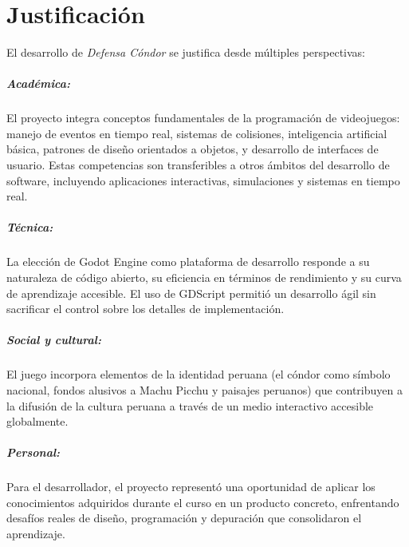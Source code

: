 \documentclass[12pt, a4paper, oneside]{report}
\begin{document}
\newpage

\chapter{Justificación}

El desarrollo de \textit{Defensa Cóndor} se justifica desde múltiples perspectivas:

\paragraph{Académica:}
El proyecto integra conceptos fundamentales de la programación de videojuegos: manejo de eventos en tiempo real, sistemas de colisiones, inteligencia artificial básica, patrones de diseño orientados a objetos, y desarrollo de interfaces de usuario. Estas competencias son transferibles a otros ámbitos del desarrollo de software, incluyendo aplicaciones interactivas, simulaciones y sistemas en tiempo real.

\paragraph{Técnica:}
La elección de Godot Engine como plataforma de desarrollo responde a su naturaleza de código abierto, su eficiencia en términos de rendimiento y su curva de aprendizaje accesible. El uso de GDScript permitió un desarrollo ágil sin sacrificar el control sobre los detalles de implementación.

\paragraph{Social y cultural:}
El juego incorpora elementos de la identidad peruana (el cóndor como símbolo nacional, fondos alusivos a Machu Picchu y paisajes peruanos) que contribuyen a la difusión de la cultura peruana a través de un medio interactivo accesible globalmente.

\paragraph{Personal:}
Para el desarrollador, el proyecto representó una oportunidad de aplicar los conocimientos adquiridos durante el curso en un producto concreto, enfrentando desafíos reales de diseño, programación y depuración que consolidaron el aprendizaje.
\end{document}
